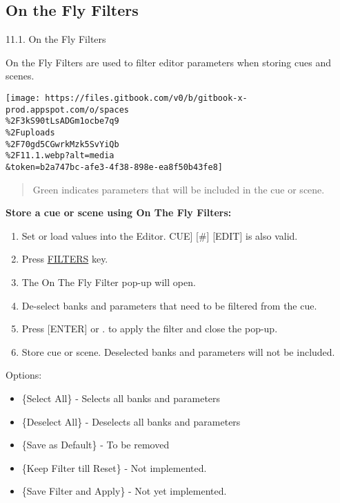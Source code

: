 \documentclass[
]{article}
\providecommand{\tightlist}{%
  \setlength{\itemsep}{0pt}\setlength{\parskip}{0pt}}
\begin{document}
\hypertarget{on-the-fly-filters}{%
\subsection{On the Fly Filters}\label{on-the-fly-filters}}

11.1. On the Fly Filters

On the Fly Filters are used to filter editor parameters when storing cues and scenes.

\texttt{[image: https://files.gitbook.com/v0/b/gitbook-x-prod.appspot.com/o/spaces\\\%2F3kS90tLsADGm1ocbe7q9\\\%2Fuploads\\\%2F70gd5CGwrkMzk5SvYiQb\\\%2F11.1.webp?alt=media\\\&token=b2a747bc-afe3-4f38-898e-ea8f50b43fe8]}

\begin{quote}
Green \href{image.png}{} indicates parameters that will be included in the cue or scene.
\end{quote}

\textbf{Store a cue or scene using On The Fly Filters:}

\begin{enumerate}
\def\labelenumi{\arabic{enumi}.}
\item
  Set or load values into the Editor. CUE{]} {[}\#{]} {[}EDIT{]} is also valid.
\item
  Press \protect\hyperlink{filters}{FILTERS} key.
\item
  The On The Fly Filter pop-up will open.
\item
  De-select banks and parameters that need to be filtered from the cue.
\item
  Press {[}ENTER{]} or \href{image.png}{} . to apply the filter and close the pop-up.
\item
  Store cue or scene. Deselected banks and parameters will not be included.
\end{enumerate}

Options:

\begin{itemize}
\tightlist
\item
  \{Select All\} - Selects all banks and parameters
\item
  \{Deselect All\} - Deselects all banks and parameters
\item
  \{Save as Default\} - {To be removed}
\item
  {\{Keep Filter till Reset\} - Not implemented.}
\item
  {\{Save Filter and Apply\} - Not yet implemented.}
\end{itemize}
\end{document}
